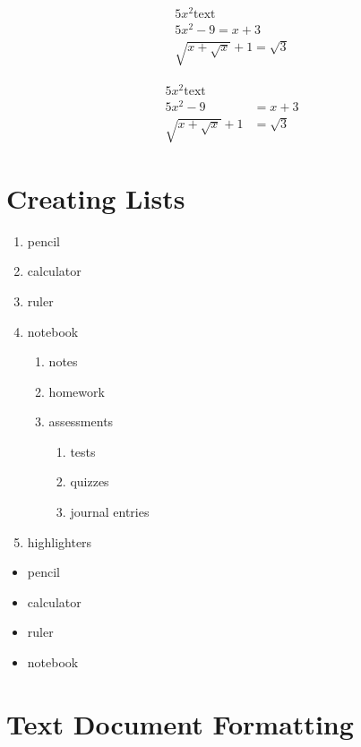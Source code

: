 \documentclass[12pt]{article}
\begin{document}
	\leavevmode
	
	\begin{align}
		5x^2 \text{text}\\
		5x^2-9=x+3\\
		\sqrt{x + \sqrt{x}} + 1 = \sqrt{3}
	\end{align}
	
	\begin{align*}
		5x^2 \text{text}\\
		5x^2-9&=x+3\\
		\sqrt{x + \sqrt{x}} + 1 &= \sqrt{3}
	\end{align*}
	
	\section{Creating Lists}
	
	\leavevmode
	
	\begin{enumerate}
		\item pencil
		\item calculator
		\item ruler
		\item notebook
			\begin{enumerate}
				\item notes
				\item homework
				\item assessments
					\begin{enumerate}
						\item tests
						\item quizzes
						\item journal entries
					\end{enumerate}
			\end{enumerate}
		\item highlighters
	\end{enumerate}
	
	\pagebreak
	
	\begin{itemize}
		\item pencil
		\item calculator
		\item ruler
		\item notebook
	\end{itemize}
	
	\section{Text Document Formatting}
	
\end{document}
